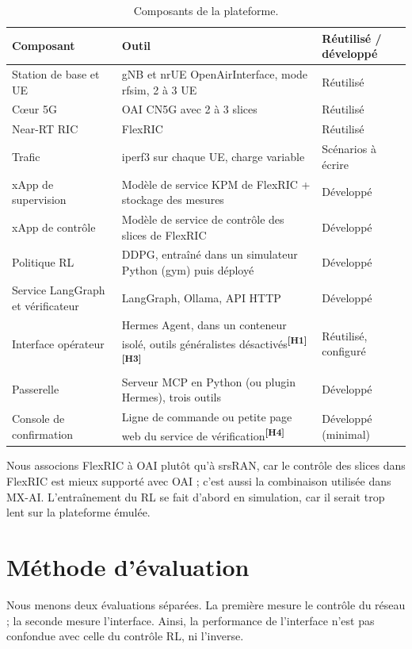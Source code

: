 \documentclass[11pt,a4paper]{article}
\newcommand{\hyp}[1]{\textsuperscript{\textbf{[H#1]}}}
\begin{document}
\begin{table}[H]
\centering\small
\begin{tabularx}{\textwidth}{@{}P{3.6cm}LP{2.6cm}@{}}
\toprule
Composant & Outil & Réutilisé / développé\\
\midrule
Station de base et UE & gNB et nrUE OpenAirInterface, mode rfsim, 2 à 3 UE & Réutilisé\\
C\oe ur 5G & OAI CN5G avec 2 à 3 slices & Réutilisé\\
Near-RT RIC & FlexRIC & Réutilisé\\
Trafic & iperf3 sur chaque UE, charge variable & Scénarios à écrire\\
xApp de supervision & Modèle de service KPM de FlexRIC + stockage des mesures & Développé\\
xApp de contrôle & Modèle de service de contrôle des slices de FlexRIC & Développé\\
Politique RL & DDPG, entraîné dans un simulateur Python (gym) puis déployé & Développé\\
Service LangGraph et vérificateur & LangGraph, Ollama, API HTTP & Développé\\
Interface opérateur & Hermes Agent, dans un conteneur isolé, outils généralistes désactivés\hyp{1}\hyp{3} & Réutilisé, configuré\\
Passerelle & Serveur MCP en Python (ou plugin Hermes), trois outils & Développé\\
Console de confirmation & Ligne de commande ou petite page web du service de vérification\hyp{4} & Développé (minimal)\\
\bottomrule
\end{tabularx}
\caption{Composants de la plateforme.}
\end{table}

Nous associons FlexRIC à OAI plutôt qu'à srsRAN, car le contrôle des slices dans
FlexRIC est mieux supporté avec OAI ; c'est aussi la combinaison utilisée dans MX-AI.
L'entraînement du RL se fait d'abord en simulation, car il serait trop lent sur la
plateforme émulée.

\section{Méthode d'évaluation}
\label{sec:eval}

Nous menons deux évaluations séparées. La première mesure le contrôle du réseau ; la
seconde mesure l'interface. Ainsi, la performance de l'interface n'est pas confondue avec
celle du contrôle RL, ni l'inverse.
\end{document}
